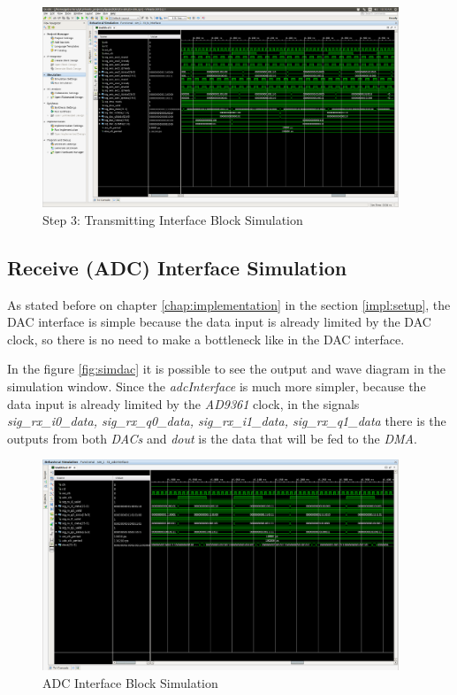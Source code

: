 \begin{figure}[htbp]
    \centering
    \includegraphics[width=0.95\textwidth]{./figures/txInterface}
    \caption{ Step 3: Transmitting Interface Block Simulation
    \label{fig:simtxif}}
\end{figure}

\subsection{Receive (ADC) Interface Simulation}

As stated before on chapter \ref{chap:implementation} in the section \ref{impl:setup},
the DAC interface is simple because the data input is already limited by the DAC
clock, so there is no need to make a bottleneck like in the DAC interface.

 In the figure \ref{fig:simdac} it is possible to see the output and wave
diagram in the simulation window. Since the \textit{adcInterface} is much more
simpler, because the data input is already limited by the \textit{AD9361}
clock, in the signals \textit{sig\_rx\_i0\_data, sig\_rx\_q0\_data,
sig\_rx\_i1\_data, sig\_rx\_q1\_data} there is the outputs from both
\textit{DACs} and \textit{dout} is the data that will be fed to the
\textit{DMA}.\\

\begin{figure}[htbp]
    \centering
    \includegraphics[width=0.95\textwidth]{./figures/adcInterface}
    \caption{ ADC Interface Block Simulation
    \label{fig:simadc}}
\end{figure}

